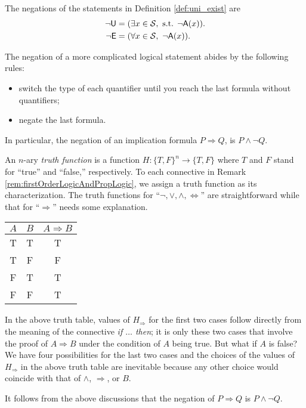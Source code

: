 \begin{axm}
  The negations of the statements in Definition \ref{def:uni_exist}
  are
  \begin{align}
  \neg \mathsf{U} &= (\exists x\in {\cal S},\text{ s.t. }
  \neg \mathsf{A}(x)).
  \\
  \neg \mathsf{E} &= (\forall x\in {\cal S},\ 
  \neg \mathsf{A}(x)).
  \end{align}
\end{axm}

\begin{rul}
  The negation of a more complicated logical statement
   abides by the following rules:
\begin{itemize}\itemsep0em
\item switch the type of each quantifier until
  you reach the last formula without quantifiers;
\item negate the last formula.
\end{itemize}
In particular, the negation of an implication formula
$P \Rightarrow Q$,
 is $P \wedge \neg Q$.
\end{rul}

\begin{rem}
  An $n$-ary \emph{truth function} is a function
  $H: \{T, F\}^n \rightarrow \{T,F\}$
  where $T$ and $F$ stand for ``true'' and ``false,'' respectively.
  To each connective in Remark \ref{rem:firstOrderLogicAndPropLogic},
  we assign a truth function as its characterization.
  The truth functions for ``$\neg, \vee, \wedge, \Leftrightarrow$''
  are straightforward while that for ``$\Rightarrow$''
  needs some explanation.
  \begin{center}
    \begin{tabular}{cc|c}
      $A$ & $B$ & $A \Rightarrow B$
      \\ \hline
      T & T & T
      \\ \hline
      T & F & F
      \\ \hline
      F & T & T
      \\ \hline
      F & F & T
      \\ \hline
    \end{tabular}
  \end{center}
  In the above truth table, 
  values of $H_{\Rightarrow}$
  for the first two cases follow directly from
  the meaning of the connective \emph{if $\ldots$ then}; 
  it is only these two cases that involve
  the proof of $A \Rightarrow B$
  under the condition of $A$ being true.
  But what if $A$ is false?
  We have four possibilities
  for the last two cases
  and the choices of the values of $H_{\Rightarrow}$
  in the above truth table
  are inevitable because any other choice
  would coincide with that of $\wedge$, $\Rightarrow$,
  or $B$.

  It follows from the above discussions that
  the negation of $P \Rightarrow Q$
  is $P \wedge \neg Q$.
\end{rem}

